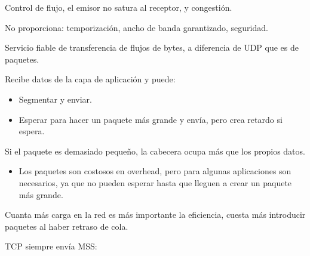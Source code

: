 \documentclass[12pt, twoside, openright]{report} %
\begin{document}
	Control de flujo, el emisor no satura al receptor, y congestión.

	No proporciona: temporización, ancho de banda garantizado,
    seguridad.

	Servicio fiable de transferencia de flujos de bytes, a diferencia de
    UDP que es de paquetes.

	Recibe datos de la capa de aplicación y puede:

    \begin{itemize}
    \item
      Segmentar y enviar.
    \item
      Esperar para hacer un paquete más grande y envía, pero crea
      retardo si espera.
    \end{itemize}

	Si el paquete es demasiado pequeño, la cabecera ocupa más que los
    propios datos.

    \begin{itemize}
    \item
      Los paquetes son costosos en overhead, pero para algunas
      aplicaciones son necesarios, ya que no pueden esperar hasta que
      lleguen a crear un paquete más grande.
    \end{itemize}

	Cuanta más carga en la red es más importante la eficiencia, cuesta
    más introducir paquetes al haber retraso de cola.

	TCP siempre envía MSS:
\end{document}
